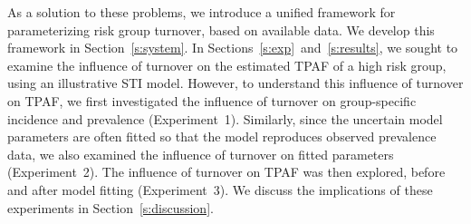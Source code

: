 \par
As a solution to these problems,
we introduce a unified framework for
parameterizing risk group turnover, based on available data.
We develop this framework in Section~\ref{s:system}.
In Sections~\ref{s:exp}~and~\ref{s:results},
we sought to examine the influence of turnover
on the estimated TPAF of a high risk group,
using an illustrative STI model.
However, to understand this influence of turnover on TPAF,
we first investigated the influence of turnover on
group-specific incidence and prevalence
(Experiment~1).
Similarly, since the uncertain model parameters are often fitted
so that the model reproduces observed prevalence data,
we also examined the influence of turnover on fitted parameters
(Experiment~2).
The influence of turnover on TPAF was then explored,
before and after model fitting
(Experiment~3).
We discuss the implications of these experiments
in Section~\ref{s:discussion}.